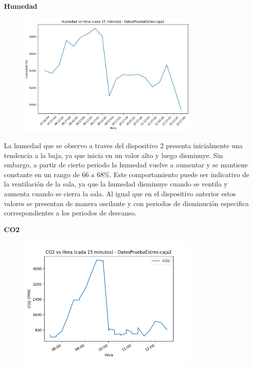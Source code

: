 \documentclass{templateNote}
\begin{document}
\newpage
\textbf{Humedad}
\begin{figure}[H]
    \centering
    \includegraphics[width=0.8\textwidth]{img/DatosPruebaEstres-caja2_humedad_vs_hora_15min.jpg}
\end{figure}

\begin{tcolorbox}
    La humedad que se observo a traves del dispositivo 2 presenta inicialmente una tendencia a la baja, ya que inicia en un valor alto y luego disminuye. Sin embargo, a partir de cierto periodo la humedad vuelve a aumentar y se mantiene constante en un rango de 66 a 68\%. Este comportamiento puede ser indicativo de la ventilación de la sala, ya que la humedad disminuye cuando se ventila y aumenta cuando se cierra la sala. Al igual que en el dispositivo anterior estos valores se presentan de manera oscilante y con periodos de disminución especifica correspondientes a los periodos de descanso.
\end{tcolorbox}

\newpage
\textbf{CO2}
\begin{figure}[H]
    \centering
    \includegraphics[width=0.8\textwidth]{img/DatosPruebaEstres-caja2_co2_vs_hora_15min.png}
\end{figure}
\end{document}
